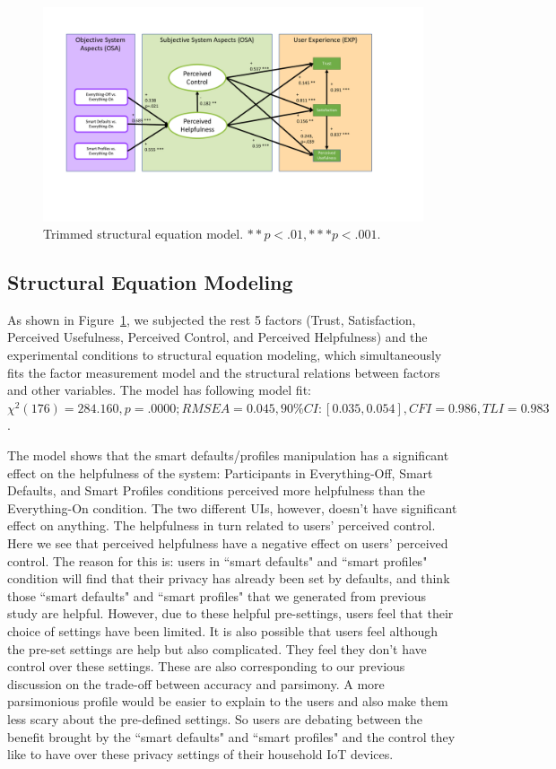 \begin{figure}[ht]
	\centering
	\includegraphics[width=\textwidth]{figures/sem_model.pdf}
	\caption{ Trimmed structural equation model. $** p < .01, *** p < .001$.}
	\label{fig:finalcoremodel}
\end{figure}

\subsection{Structural Equation Modeling}

As shown in Figure~\ref{fig:finalcoremodel}, we subjected the rest 5 factors (Trust, Satisfaction, Perceived Usefulness, Perceived Control, and Perceived Helpfulness) and the experimental conditions to structural equation modeling, which simultaneously fits the factor measurement model and the structural relations between factors and other variables. The model has following model fit: ${\chi}^{2}(176) = 284.160, p = .0000; RMSEA = 0.045, 90\% CI: [0.035, 0.054], CFI = 0.986, TLI = 0.983$.

The model shows that the smart defaults/profiles manipulation has a significant effect on the helpfulness of the system: Participants in Everything-Off, Smart Defaults, and Smart Profiles conditions perceived more helpfulness than the Everything-On condition. The two different UIs, however, doesn't have significant effect on anything. The helpfulness in turn related to users' perceived control. Here we see that perceived helpfulness have a negative effect on users' perceived control. The reason for this is: users in ``smart defaults" and ``smart profiles" condition will find that their privacy has already been set by defaults, and think those ``smart defaults" and ``smart profiles" that we generated from previous study are helpful. However, due to these helpful pre-settings, users feel that their choice of settings have been limited. It is also possible that users feel although the pre-set settings are help but also complicated. They feel they don't have control over these settings. These are also corresponding to our previous discussion on the trade-off between accuracy and parsimony. A more parsimonious profile would be easier to explain to the users and also make them less scary about the pre-defined settings. So users are debating between the benefit brought by the ``smart defaults" and ``smart profiles" and the control they like to have over these privacy settings of their household IoT devices.

